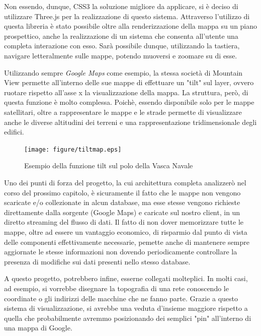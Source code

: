 Non essendo, dunque, CSS3 la soluzione migliore da applicare, si è deciso di utilizzare Three.js per la realizzazione di questo sistema. Attraverso l'utilizzo di questa libreria è stato possibile oltre alla renderizzazione della mappa su un piano prospettico, anche la realizzazione di un sistema che consenta all'utente una completa interazione con esso. Sarà possibile dunque, utilizzando la tastiera, navigare letteralmente sulle mappe, potendo muoversi e zoomare su di esse.

Utilizzando sempre \textit{Google Maps} come esempio, la stessa società di Mountain View permette all'interno delle sue mappe di effettuare un "tilt" sul layer, ovvero ruotare rispetto all'asse x la visualizzazione della mappa. La struttura, però, di questa funzione è molto complessa. Poichè, essendo disponibile solo per le mappe satellitari, oltre a rappresentare le mappe e le strade permette di visualizzare anche le diverse altitudini dei terreni e una rappresentazione tridimensionale degli edifici.

\begin{figure}[H]
	\centering
	\texttt{[image: figure/tiltmap.eps]}
	\caption{Esempio della funzione tilt sul polo della Vasca Navale}\label{fig:tiltmap}
\end{figure}

Uno dei punti di forza del progetto, la cui architettura completa analizzerò nel corso del prossimo capitolo, è sicuramente il fatto che le mappe non vengono scaricate e/o collezionate in alcun database, ma esse stesse vengono richieste direttamente dalla sorgente (Google Maps) e caricate sul nostro client, in un diretto streaming del flusso di dati. Il fatto di non dover memorizzare tutte le mappe, oltre ad essere un vantaggio economico, di risparmio dal punto di vista delle componenti effettivamente necessarie, pemette anche di mantenere sempre aggiornate le stesse informazioni non dovendo  periodicamente controllare la presenza di modifiche sui dati presenti nello stesso database.

A questo progetto, potrebbero infine, esserne collegati molteplici. In molti casi, ad esempio, si vorrebbe disegnare la topografia di una rete conoscendo le coordinate o gli indirizzi delle macchine che ne fanno parte. Grazie a questo sistema di visualizzazione, si avrebbe una veduta d'insieme maggiore rispetto a quella che probabilmente avremmo posizionando dei semplici "pin" all'interno di una mappa di Google.